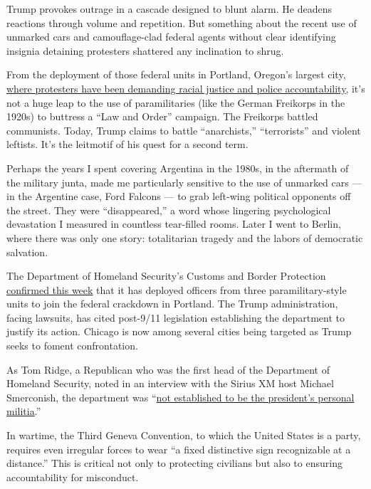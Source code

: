 Trump provokes outrage in a cascade designed to blunt alarm. He deadens
reactions through volume and repetition. But something about the recent
use of unmarked cars and camouflage-clad federal agents without clear
identifying insignia detaining protesters shattered any inclination to
shrug.

From the deployment of those federal units in Portland, Oregon's largest
city,
\href{https://www.nytimes3xbfgragh.onion/2020/07/24/us/portland-oregon-protests-white-race.html}{where
protesters have been demanding racial justice and police
accountability}, it's not a huge leap to the use of paramilitaries (like
the German Freikorps in the 1920s) to buttress a ``Law and Order''
campaign. The Freikorps battled communists. Today, Trump claims to
battle ``anarchists,'' ``terrorists'' and violent leftists. It's the
leitmotif of his quest for a second term.

Perhaps the years I spent covering Argentina in the 1980s, in the
aftermath of the military junta, made me particularly sensitive to the
use of unmarked cars --- in the Argentine case, Ford Falcons --- to grab
left-wing political opponents off the street. They were ``disappeared,''
a word whose lingering psychological devastation I measured in countless
tear-filled rooms. Later I went to Berlin, where there was only one
story: totalitarian tragedy and the labors of democratic salvation.

The Department of Homeland Security's Customs and Border Protection
\href{https://www.google.com/url?q=https://www.reuters.com/article/us-global-race-protests-agents/us-homeland-security-confirms-three-units-sent-paramilitary-officers-to-portland-idUSKCN24M2RL\&sa=D\&ust=1595604281633000\&usg=AFQjCNESMShE-qwX6DEJY8-UmYcYsMRIdg}{confirmed
this week} that it has deployed officers from three paramilitary-style
units to join the federal crackdown in Portland. The Trump
administration, facing lawsuits, has cited post-9/11 legislation
establishing the department to justify its action. Chicago is now among
several cities being targeted as Trump seeks to foment confrontation.

As Tom Ridge, a Republican who was the first head of the Department of
Homeland Security, noted in an interview with the Sirius XM host Michael
Smerconish, the department was
``\href{https://www.siriusxm.com/clips/clip/a9914a41-78d6-4402-8150-b8f14a44945b/715571de-a566-4492-ba13-bbe09f516300}{not
established to be the president's personal militia}.''

In wartime, the Third Geneva Convention, to which the United States is a
party, requires even irregular forces to wear ``a fixed distinctive sign
recognizable at a distance.'' This is critical not only to protecting
civilians but also to ensuring accountability for misconduct.

